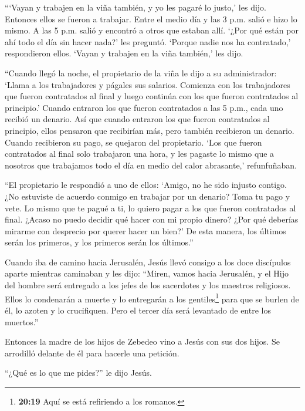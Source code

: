  ```Vayan y trabajen en la viña también, y yo les pagaré lo
justo,' les dijo. Entonces ellos se fueron a trabajar. 
Entre el medio día y las 3 p.m. salió e hizo lo mismo.  A
las 5 p.m. salió y encontró a otros que estaban allí. `¿Por qué están
por ahí todo el día sin hacer nada?' les preguntó.  `Porque
nadie nos ha contratado,' respondieron ellos. `Vayan y trabajen en la
viña también,' les dijo.

 ``Cuando llegó la noche, el propietario de la viña le dijo
a su administrador: `Llama a los trabajadores y págales sus salarios.
Comienza con los trabajadores que fueron contratados al final y luego
continúa con los que fueron contratados al principio.' 
Cuando entraron los que fueron contratados a las 5 p.m., cada uno
recibió un denario.  Así que cuando entraron los que fueron
contratados al principio, ellos pensaron que recibirían más, pero
también recibieron un denario.  Cuando recibieron su pago,
se quejaron del propietario.  `Los que fueron contratados
al final solo trabajaron una hora, y les pagaste lo mismo que a nosotros
que trabajamos todo el día en medio del calor abrasante,' refunfuñaban.

 ``El propietario le respondió a uno de ellos: `Amigo, no
he sido injusto contigo. ¿No estuviste de acuerdo conmigo en trabajar
por un denario?  Toma tu pago y vete. Lo mismo que te pagué
a ti, lo quiero pagar a los que fueron contratados al final.
 ¿Acaso no puedo decidir qué hacer con mi propio dinero?
¿Por qué deberías mirarme con desprecio por querer hacer un bien?'
 De esta manera, los últimos serán los primeros, y los
primeros serán los últimos.''

 Cuando iba de camino hacia Jerusalén, Jesús llevó consigo
a los doce discípulos aparte mientras caminaban y les dijo:
 ``Miren, vamos hacia Jerusalén, y el Hijo del hombre será
entregado a los jefes de los sacerdotes y los maestros religiosos. Ellos
lo condenarán a muerte  y lo entregarán a los
gentiles\footnote{\textbf{20:19} Aquí se está refiriendo a los romanos.}
para que se burlen de él, lo azoten y lo crucifiquen. Pero el tercer día
será levantado de entre los muertos.''

 Entonces la madre de los hijos de Zebedeo vino a Jesús con
sus dos hijos. Se arrodilló delante de él para hacerle una petición.

 ``¿Qué es lo que me pides?'' le dijo Jesús.

